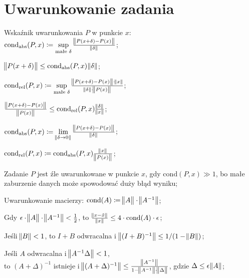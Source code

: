 \section{Uwarunkowanie zadania}

\entry
Wskaźnik uwarunkowania $P$ w punkcie $x$:\\ $\mathrm{cond}_{\mathrm{abs}}(P,x) \coloneqq \sup\limits_{\text{małe }\delta} \frac{\norm{P(x+\delta) - P(x)}}{\norm{\delta}}$;

\entry
$\norm{P(x+\delta)} \leq \mathrm{cond}_{\mathrm{abs}}(P,x)\norm{\delta}$;

\entry
$\mathrm{cond}_{\mathrm{rel}}(P,x) \coloneqq \sup\limits_{\text{małe }\delta} \frac{\norm{P(x+\delta) - P(x)} \cdot \norm{x}}{\norm{\delta} \cdot \norm{P(x)}}$;

\entry
$\frac{\norm{P(x+\delta) - P(x)}}{\norm{P(x)}} \leq \mathrm{cond}_{\mathrm{rel}}(P,x)\frac{\norm{\delta}}{\norm{x}}$;


\entry
$\mathrm{cond}_{\mathrm{abs}}(P,x) \coloneqq \lim\limits_{\norm{\delta \to 0}} \frac{\norm{P(x+\delta) - P(x)}}{\norm{\delta}}$;

\entry
$\mathrm{cond}_{\mathrm{rel}}(P,x) \coloneqq \mathrm{cond}_{\mathrm{abs}}(P,x)\frac{\norm{x}}{\norm{P(x)}} $;

\entry
Zadanie $P$ jest źle uwarunkowane w punkcie $x$, gdy $\mathrm{cond}(P,x) \gg 1$, bo małe zaburzenie danych może spowodować duży błąd wyniku;

\entry
Uwarunkowanie macierzy: $\mathrm{cond}(A) \coloneqq \norm{\vphantom{A^{-1}}A}\cdot\norm{A^{-1}}$;

\entry
Gdy $\epsilon\cdot\norm{\vphantom{A^1}A}\cdot\norm{A^{-1}} < \frac{1}{2}$, to $\frac{\norm{x - \tilde{x}}}{\norm{x}} \leq 4 \cdot \mathrm{cond}(A) \cdot \epsilon$;

\entry
Jeśli $\norm{B} < 1$, to $I+B$ odwracalna i $\norm{(I+B)^{-1}} \leq 1 / (1 - \norm{B})$;

\entry
Jeśli $A$ odwracalna i $\norm{A^{-1}\Delta} < 1$,\\ to $(A+\Delta)^{-1}$ istnieje i $\norm{(A+\Delta)^{-1}} \leq \frac{\norm{A^{-1}}}{1 - \norm{A^{-1}} \cdot \norm{\vphantom{A^1}\Delta}}$, gdzie $\Delta \leq \epsilon\norm{A}$;



